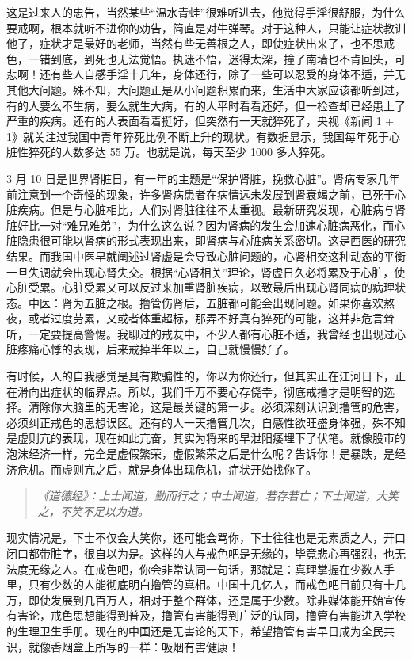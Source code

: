 这是过来人的忠告，当然某些“温水青蛙”很难听进去，他觉得手淫很舒服，为什么要戒啊，根本就听不进你的劝告，简直是对牛弹琴。对于这种人，只能让症状教训他了，症状才是最好的老师，当然有些无善根之人，即使症状出来了，也不思戒色，一错到底，到死也无法觉悟。执迷不悟，迷得太深，撞了南墙也不肯回头，可悲啊！还有些人自感手淫十几年，身体还行，除了一些可以忍受的身体不适，并无其他大问题。殊不知，大问题正是从小问题积累而来，生活中大家应该都听到过，有的人要么不生病，要么就生大病，有的人平时看看还好，但一检查却已经患上了严重的疾病。还有的人表面看着挺好，但突然有一天就猝死了，央视《新闻 1 + 1》就关注过我国中青年猝死比例不断上升的现状。有数据显示，我国每年死于心脏性猝死的人数多达 55 万。也就是说，每天至少 1000 多人猝死。

3 月 10 日是世界肾脏日，有一年的主题是“保护肾脏，挽救心脏”。肾病专家几年前注意到一个奇怪的现象，许多肾病患者在病情远未发展到肾衰竭之前，已死于心脏疾病。但是与心脏相比，人们对肾脏往往不太重视。最新研究发现，心脏病与肾脏好比一对“难兄难弟”，为什么这么说？因为肾病的发生会加速心脏病恶化，而心脏隐患很可能以肾病的形式表现出来，即肾病与心脏病关系密切。这是西医的研究结果。而我国中医早就阐述过肾虚是会导致心脏问题的，心肾相交这种动态的平衡一旦失调就会出现心肾失交。根据“心肾相关”理论，肾虚日久必将累及于心脏，使心脏受累。心脏受累又可以反过来加重肾脏疾病，以致最后出现心肾同病的病理状态。中医：肾为五脏之根。撸管伤肾后，五脏都可能会出现问题。如果你喜欢熬夜，或者过度劳累，又或者体重超标，那弄不好真有猝死的可能，这并非危言耸听，一定要提高警惕。我聊过的戒友中，不少人都有心脏不适，我曾经也出现过心脏疼痛心悸的表现，后来戒掉半年以上，自己就慢慢好了。

有时候，人的自我感觉是具有欺骗性的，你以为你还行，但其实正在江河日下，正在滑向出症状的临界点。所以，我们千万不要心存侥幸，彻底戒撸才是明智的选择。清除你大脑里的无害论，这是最关键的第一步。必须深刻认识到撸管的危害，必须纠正戒色的思想误区。还有的人一天撸管几次，自感性欲旺盛身体强，殊不知是虚则亢的表现，现在如此亢奋，其实为将来的早泄阳痿埋下了伏笔。就像股市的泡沫经济一样，完全是虚假繁荣，虚假繁荣之后是什么呢？告诉你！是暴跌，是经济危机。而虚则亢之后，就是身体出现危机，症状开始找你了。

\begin{quote}\it
    《道德经》：上士闻道，勤而行之；中士闻道，若存若亡；下士闻道，大笑之，不笑不足以为道。
\end{quote}

现实情况是，下士不仅会大笑你，还可能会骂你，下士往往也是无素质之人，开口闭口都带脏字，很自以为是。这样的人与戒色吧是无缘的，毕竟悲心再强烈，也无法度无缘之人。在戒色吧，你会非常认同一句话，那就是：真理掌握在少数人手里，只有少数的人能彻底明白撸管的真相。中国十几亿人，而戒色吧目前只有十几万，即使发展到几百万人，相对于整个群体，还是属于少数。除非媒体能开始宣传有害论，戒色思想能得到普及，撸管有害能得到广泛的认同，撸管有害能进入学校的生理卫生手册。现在的中国还是无害论的天下，希望撸管有害早日成为全民共识，就像香烟盒上所写的一样：吸烟有害健康！


